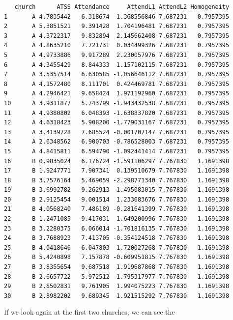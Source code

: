 \documentclass[
  english,
]{book}
\begin{document}
\begin{verbatim}
   church      ATSS Attendance     AttendL1 AttendL2 Homogeneity
1       A 4.7835442   6.318674 -1.368556846 7.687231   0.7957395
2       A 5.3851521   9.391428  1.704196481 7.687231   0.7957395
3       A 4.3722317   9.832894  2.145662408 7.687231   0.7957395
4       A 4.8635210   7.721731  0.034499326 7.687231   0.7957395
5       A 4.9733886   9.917289  2.230057976 7.687231   0.7957395
6       A 4.3455429   8.844333  1.157102115 7.687231   0.7957395
7       A 3.5357514   6.630585 -1.056646112 7.687231   0.7957395
8       A 4.1572480   8.111701  0.424469781 7.687231   0.7957395
9       A 4.2946421   9.658424  1.971192960 7.687231   0.7957395
10      A 3.9311877   5.743799 -1.943432538 7.687231   0.7957395
11      A 4.9380802   6.048393 -1.638837820 7.687231   0.7957395
12      A 4.6318423   5.908200 -1.779031167 7.687231   0.7957395
13      A 3.4139728   7.685524 -0.001707147 7.687231   0.7957395
14      A 2.6348562   6.900703 -0.786528003 7.687231   0.7957395
15      A 4.8415811   6.594790 -1.092441414 7.687231   0.7957395
16      B 0.9835024   6.176724 -1.591106297 7.767830   1.1691398
17      B 1.9247771   7.907341  0.139510679 7.767830   1.1691398
18      B 3.7576164   5.469059 -2.298771340 7.767830   1.1691398
19      B 3.6992782   9.262913  1.495083015 7.767830   1.1691398
20      B 2.9125454   9.001514  1.233683676 7.767830   1.1691398
21      B 4.0568240   7.486189 -0.281641399 7.767830   1.1691398
22      B 1.2471085   9.417031  1.649200996 7.767830   1.1691398
23      B 3.2280375   6.066014 -1.701816135 7.767830   1.1691398
24      B 3.7688923   7.413705 -0.354124518 7.767830   1.1691398
25      B 4.0418646   6.047803 -1.720027268 7.767830   1.1691398
26      B 5.4240898   7.157878 -0.609951815 7.767830   1.1691398
27      B 3.8355654   9.687518  1.919687868 7.767830   1.1691398
28      B 2.6657722   5.972512 -1.795317977 7.767830   1.1691398
29      B 2.8502831   9.761905  1.994075223 7.767830   1.1691398
30      B 2.8982202   9.689345  1.921515292 7.767830   1.1691398
\end{verbatim}

If we look again at the first two churches, we can see the
\end{document}
